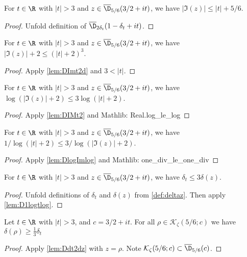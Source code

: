 \begin{lemma} \label{lem:DImt2d}  \leanok
For $t\in \R$ with $|t|>3$ and $z\in \overline{\D}_{5/6}(3/2+it)$, we have  $|\Im(z)| \le |t|+5/6$.
\end{lemma}
\begin{proof}
\leanok
Unfold definition of $\overline{\D}_{2\delta_t}(1-\delta_t+it)$.
\end{proof}

\begin{lemma} \label{lem:DIMt2}  \leanok
For $t\in \R$ with $|t|>3$ and $z\in \overline{\D}_{5/6}(3/2+it)$, we have $|\Im(z)|+2 \le (|t|+2)^3$.
\end{lemma}
\begin{proof}
\leanok
Apply \cref{lem:DImt2d} and $3<|t|$.
\end{proof}

\begin{lemma} \label{lem:DlogImlog}  \leanok
For $t\in \R$ with $|t|>3$ and $z\in \overline{\D}_{5/6}(3/2+it)$, we have $\log(|\Im(z)|+2) \le 3\log(|t|+2)$.
\end{lemma}
\begin{proof}
\leanok
Apply \cref{lem:DIMt2} and Mathlib: Real.log\_le\_log
\end{proof}

\begin{lemma} \label{lem:D1logtlog}  \leanok
For $t\in \R$ with $|t|>3$ and $z\in \overline{\D}_{5/6}(3/2+it)$, we have $1/\log(|t|+2) \le 3/\log(|\Im(z)|+2)$.
\end{lemma}
\begin{proof}
\leanok
Apply \cref{lem:DlogImlog} and Mathlib: one\_div\_le\_one\_div
\end{proof}

\begin{lemma} \label{lem:Ddt2dz}  \leanok
For $t\in \R$ with $|t|>3$ and $z\in \overline{\D}_{5/6}(3/2+it)$, we have $\delta_t \le 3\delta(z)$.
\end{lemma}
\begin{proof}
\leanok
Unfold definitions of $\delta_t$ and $\delta(z)$ from \cref{def:deltaz}. Then apply \cref{lem:D1logtlog}.
\end{proof}

\begin{lemma} \label{lem:deltarhotodeltat}  \leanok
Let $t\in\R$ with $|t|>3$, and $c=3/2+it$. For all $\rho\in\mathcal K_{\zeta}(5/6;c)$ we have $\delta(\rho) \ge \frac{1}{3}\delta_t$
\end{lemma}
\begin{proof}
\leanok
Apply \cref{lem:Ddt2dz} with $z=\rho$. Note $\mathcal K_{\zeta}(5/6;c)\subset \overline{\D}_{5/6}(c)$.
\end{proof}

